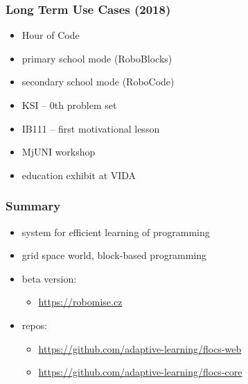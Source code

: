 \documentclass[xcolor=dvipsnames, 14pt]{beamer}
\begin{document}
\begin{frame}
\frametitle{Long Term Use Cases (2018)}
\begin{itemize}
\item Hour of Code  %
\item primary school mode (RoboBlocks)  %
\item secondary school mode (RoboCode)
\item KSI -- 0th problem set %
\item IB111 -- first motivational lesson  %
\item MjUNI workshop
\item education exhibit at VIDA  %
\end{itemize}
\end{frame}

\begin{frame}
\frametitle{Summary}
\begin{itemize}
\item system for efficient learning of programming %
\item grid space world, block-based programming
\item beta version:\\
  \begin{itemize}
  \item {\footnotesize \url{https://robomise.cz}}
  \end{itemize}
\item repos:\\
  \begin{itemize}
  \item {\footnotesize \url{https://github.com/adaptive-learning/flocs-web}}
  \item {\footnotesize \url{https://github.com/adaptive-learning/flocs-core}}
  \end{itemize}
\end{itemize}
\end{frame}
\end{document}

